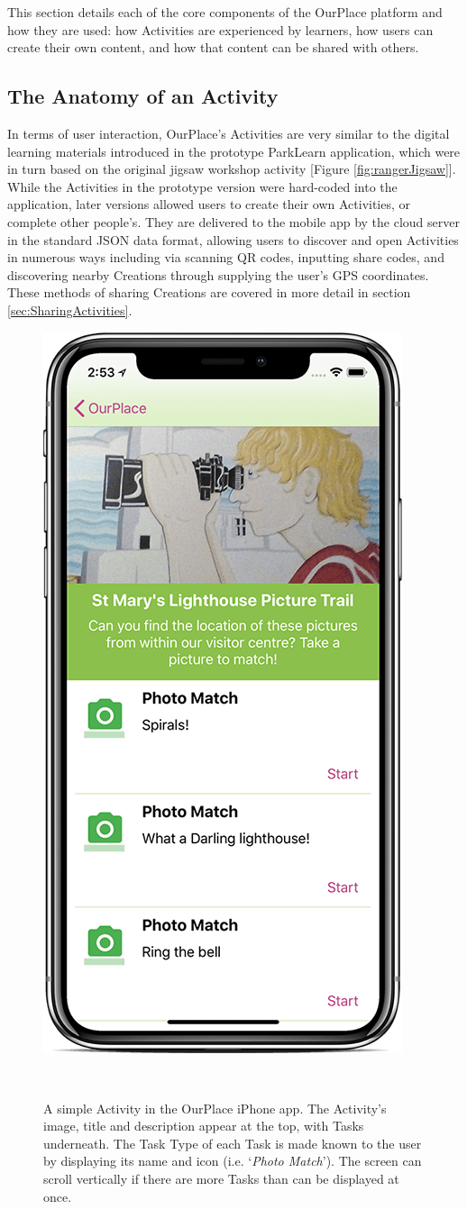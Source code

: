 This section details each of the core components of the OurPlace platform and how they are used: how Activities are experienced by learners, how users can create their own content, and how that content can be shared with others.

\subsection{The Anatomy of an Activity}
\label{sec:ActivityOverview}
In terms of user interaction, OurPlace's Activities are very similar to the digital learning materials introduced in the prototype ParkLearn application, which were in turn based on the original jigsaw workshop activity [Figure \ref{fig:rangerJigsaw}]. While the Activities in the prototype version were hard-coded into the application, later versions allowed users to create their own Activities, or complete other people's. They are delivered to the mobile app by the cloud server in the standard JSON data format, allowing users to discover and open Activities in numerous ways including via scanning QR codes, inputting share codes, and discovering nearby Creations through supplying the user's GPS coordinates. These methods of sharing Creations are covered in more detail in section \ref{sec:SharingActivities}. 

\begin{figure}
  \centering
  \includegraphics[width=0.45\columnwidth]{images/chapter05/activity.png}
  \caption[A simple OurPlace Activity]{ A simple Activity in the OurPlace iPhone app. The Activity's image, title and description appear at the top, with Tasks underneath. The Task Type of each Task is made known to the user by displaying its name and icon (i.e. `\textit{Photo Match}'). The screen can scroll vertically if there are more Tasks than can be displayed at once.}~\label{fig:ActivityExample}
\end{figure}

